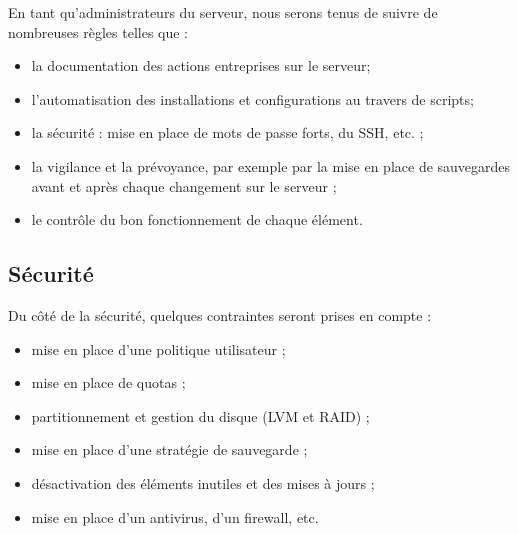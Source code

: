En tant qu'administrateurs du serveur, nous serons tenus de suivre de nombreuses
règles telles que :
\begin{itemize}
\item la documentation des actions entreprises sur le serveur;
\item l'automatisation des installations et configurations au travers de scripts;
\item la sécurité : mise en place de mots de passe forts, du SSH, etc. ;
\item la vigilance et la prévoyance, par exemple par la mise en place de
  sauvegardes avant et après chaque changement sur le serveur ;
\item le contrôle du bon fonctionnement de chaque élément.
\end{itemize}

\subsection{Sécurité}
\label{subsec:securite}

Du côté de la sécurité, quelques contraintes seront prises en compte :
\begin{itemize}
\item mise en place d'une politique utilisateur ;
\item mise en place de quotas ;
\item partitionnement et gestion du disque (LVM et RAID) ;
\item mise en place d'une stratégie de sauvegarde ;
\item désactivation des éléments inutiles et des mises à jours ;
\item mise en place d'un antivirus, d'un firewall, etc.
\end{itemize}

